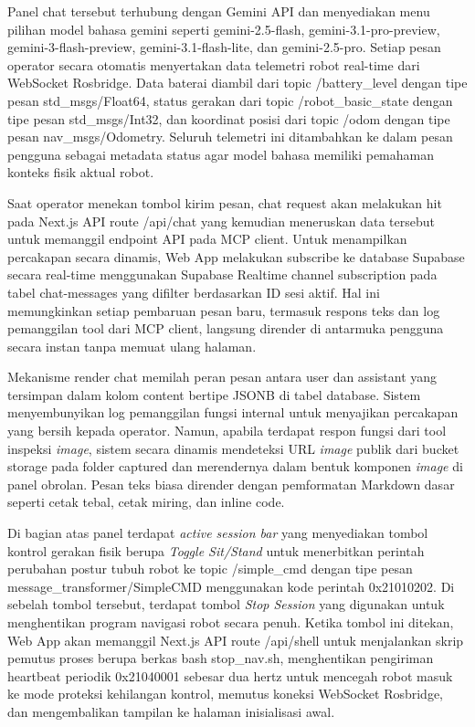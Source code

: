 Panel chat tersebut terhubung dengan Gemini API dan menyediakan menu pilihan model bahasa gemini seperti gemini-2.5-flash, gemini-3.1-pro-\allowbreak preview, gemini-3-flash-\allowbreak preview, gemini-3.1-flash-lite, dan gemini-2.5-pro. Setiap pesan operator secara otomatis menyertakan data telemetri robot real-time dari WebSocket Rosbridge. Data baterai diambil dari topic /battery\_\allowbreak level dengan tipe pesan std\_msgs/\allowbreak Float64, status gerakan dari topic /robot\_\allowbreak basic\_\allowbreak state dengan tipe pesan std\_msgs/\allowbreak Int32, dan koordinat posisi dari topic /odom dengan tipe pesan nav\_msgs/\allowbreak Odometry. Seluruh telemetri ini ditambahkan ke dalam pesan pengguna sebagai metadata status agar model bahasa memiliki pemahaman konteks fisik aktual robot.

Saat operator menekan tombol kirim pesan, chat request akan melakukan hit pada Next.js API route /api/chat yang kemudian meneruskan data tersebut untuk memanggil endpoint API pada MCP client. Untuk menampilkan percakapan secara dinamis, Web App melakukan subscribe ke database Supabase secara real-time menggunakan Supabase Realtime channel subscription pada tabel chat-\allowbreak messages yang difilter berdasarkan ID sesi aktif. Hal ini memungkinkan setiap pembaruan pesan baru, termasuk respons teks dan log pemanggilan tool dari MCP client, langsung dirender di antarmuka pengguna secara instan tanpa memuat ulang halaman.

Mekanisme render chat memilah peran pesan antara user dan assistant yang tersimpan dalam kolom content bertipe JSONB di tabel database. Sistem menyembunyikan log pemanggilan fungsi internal untuk menyajikan percakapan yang bersih kepada operator. Namun, apabila terdapat respon fungsi dari tool inspeksi \textit{image}, sistem secara dinamis mendeteksi URL \textit{image} publik dari bucket storage pada folder captured dan merendernya dalam bentuk komponen \textit{image} di panel obrolan. Pesan teks biasa dirender dengan pemformatan Markdown dasar seperti cetak tebal, cetak miring, dan inline code.

Di bagian atas panel terdapat \textit{active session bar} yang menyediakan tombol kontrol gerakan fisik berupa \textit{Toggle Sit/Stand} untuk menerbitkan perintah perubahan postur tubuh robot ke topic /simple\_cmd dengan tipe pesan message\_transformer/SimpleCMD menggunakan kode perintah 0x21010202. Di sebelah tombol tersebut, terdapat tombol \textit{Stop Session} yang digunakan untuk menghentikan program navigasi robot secara penuh. Ketika tombol ini ditekan, Web App akan memanggil Next.js API route /api/shell untuk menjalankan skrip pemutus proses berupa berkas bash stop\_nav.sh, menghentikan pengiriman heartbeat periodik 0x21040001 sebesar dua hertz untuk mencegah robot masuk ke mode proteksi kehilangan kontrol, memutus koneksi WebSocket Rosbridge, dan mengembalikan tampilan ke halaman inisialisasi awal.

